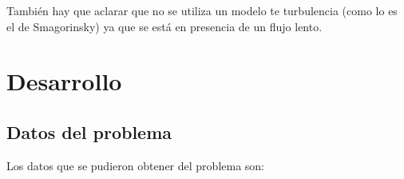 \documentclass[10pt,a4paper,final]{article}
\begin{document}
También hay que aclarar que no se utiliza un modelo te turbulencia (como lo es el de Smagorinsky) ya que se está en presencia de un flujo lento.
\section{Desarrollo}
\subsection{Datos del problema}
\label{datos_problema}
Los datos que se pudieron obtener del problema son:
\end{document}

